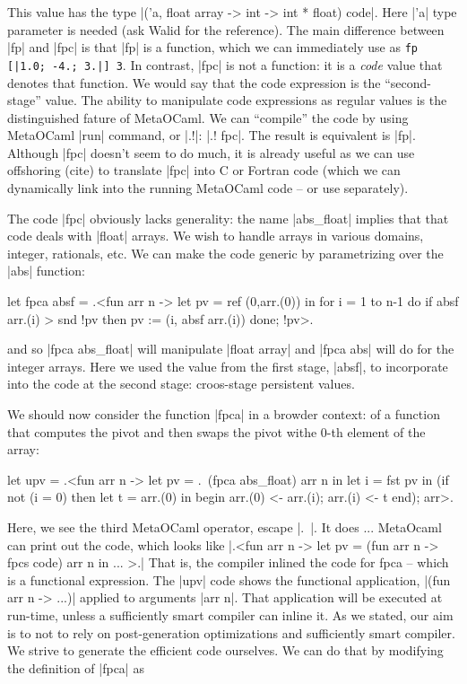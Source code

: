 \documentclass[11pt]{llncs}
\begin{document}
This value has the type |('a, float array -> int -> int * float) code|.
Here |'a| type parameter is needed (ask Walid for the reference).
The main difference between |fp| and |fpc| is that |fp| is a function,
which we can immediately use as \verb^fp [|1.0; -4.; 3.|] 3^. In
contrast, |fpc| is not a function: it is a \emph{code} value that denotes
that function. We would say that the code expression is the
``second-stage'' value. The ability to manipulate code expressions as
regular values is the distinguished fature of MetaOCaml.
We can ``compile'' the code by using MetaOCaml |run| command, or |.!|:
|.! fpc|. The result is equivalent is |fp|. Although |fpc| doesn't
seem to do much, it is already useful as we can use offshoring (cite)
to translate |fpc| into C or Fortran code (which we can dynamically
link into the running MetaOCaml code -- or use separately).

The code |fpc| obviously lacks generality: the name |abs_float|
implies that that code deals with |float| arrays. We wish to handle
arrays in various domains, integer, rationals, etc. We can make the
code generic by parametrizing over the |abs| function:

\begin{code}
let fpca absf = .<fun arr n ->
   let pv = ref (0,arr.(0)) in
   for i = 1 to n-1 do
     if absf arr.(i) > snd !pv then
        pv := (i, absf arr.(i))
   done;
   !pv>.
\end{code}

and so |fpca abs_float| will manipulate |float array| and |fpca abs|
will do for the integer arrays. Here we used the value from the first
stage, |absf|, to incorporate into the code at the second stage:
croos-stage persistent values.

We should now consider the function |fpca| in a browder context: of a
function that computes the pivot and then swaps the pivot withe 0-th
element of the array:

\begin{code}
let upv = .<fun arr n ->
   let pv = .~(fpca abs_float) arr n in
   let i = fst pv in
   (if not (i = 0) then
      let t = arr.(0) in
      begin arr.(0) <- arr.(i); arr.(i) <- t end);
   arr>.
\end{code}

Here, we see the third MetaOCaml operator, escape |.~|. It does ...
MetaOcaml can print out the code, which looks like
|.<fun arr n -> let pv = (fun arr n -> fpcs code) arr n in ... >.|
That is, the compiler inlined the code for fpca -- which is a
functional expression. The |upv| code shows the functional
application, |(fun arr n -> ...)| applied to arguments |arr n|. That
application will be executed at run-time, unless a sufficiently smart
compiler can inline it. As we stated, our aim is to not to rely on
post-generation optimizations and sufficiently smart compiler. We
strive to generate the efficient code ourselves. We can do that by
modifying the definition of |fpca| as
\end{document}
